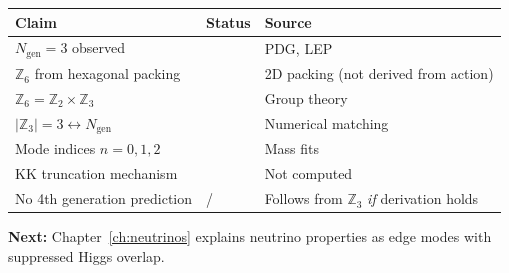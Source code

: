 \begin{tcolorbox}[colback=orange!5, colframe=orange!50!black,
    title=\textbf{Epistemic Audit: Chapter 8}]
\begin{center}
\begin{tabular}{lll}
\toprule
\textbf{Claim} & \textbf{Status} & \textbf{Source} \\
\midrule
$N_{\text{gen}} = 3$ observed & \tagBL{} & PDG, LEP \\
$\mathbb{Z}_6$ from hexagonal packing & \tagP{} & 2D packing (not derived from action) \\
$\mathbb{Z}_6 = \mathbb{Z}_2 \times \mathbb{Z}_3$ & \tagM{} & Group theory \\
$|\mathbb{Z}_3| = 3 \leftrightarrow N_{\text{gen}}$ & \tagI{} & Numerical matching \\
Mode indices $n = 0,1,2$ & \tagI{} & Mass fits \\
KK truncation mechanism & \tagP{} & Not computed \\
No 4th generation prediction & \tagI{}/\tagP{} & Follows from $\mathbb{Z}_3$ \emph{if} derivation holds \\
\bottomrule
\end{tabular}
\end{center}
\end{tcolorbox}

\textbf{Next:} Chapter~\ref{ch:neutrinos} explains neutrino properties as
edge modes with suppressed Higgs overlap.

